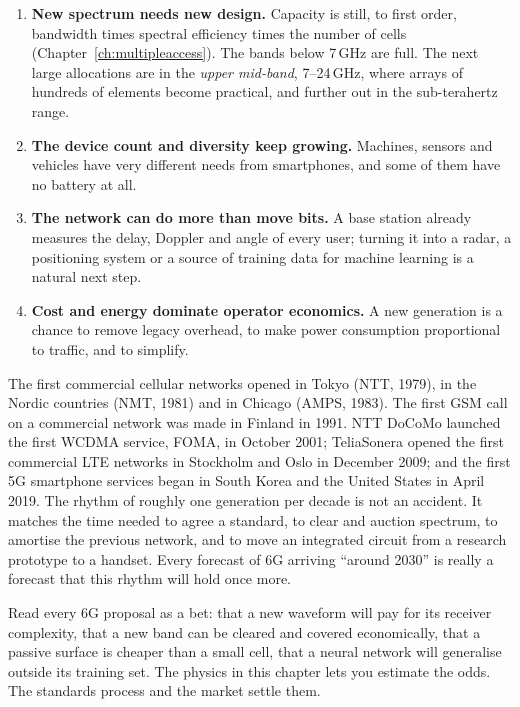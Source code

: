 
\begin{enumerate}
\item \textbf{New spectrum needs new design.} Capacity is still, to first order, bandwidth times
spectral efficiency times the number of cells (Chapter~\ref{ch:multipleaccess}). The bands below
7\,GHz are full. The next large allocations are in the \emph{upper mid-band}, 7--24\,GHz, where
arrays of hundreds of elements become practical, and further out in the sub-terahertz range.
\item \textbf{The device count and diversity keep growing.} Machines, sensors and vehicles have very
different needs from smartphones, and some of them have no battery at all.
\item \textbf{The network can do more than move bits.} A base station already measures the delay,
Doppler and angle of every user; turning it into a radar, a positioning system or a source of
training data for machine learning is a natural next step.
\item \textbf{Cost and energy dominate operator economics.} A new generation is a chance to remove
legacy overhead, to make power consumption proportional to traffic, and to simplify.
\end{enumerate}

\begin{history}
The first commercial cellular networks opened in Tokyo (NTT, 1979), in the Nordic countries (NMT,
1981) and in Chicago (AMPS, 1983). The first GSM call on a commercial network was made in Finland in
1991. NTT DoCoMo launched the first WCDMA service, FOMA, in October 2001; TeliaSonera opened the first
commercial LTE networks in Stockholm and Oslo in December 2009; and the first 5G smartphone services
began in South Korea and the United States in April 2019. The rhythm of roughly one generation per
decade is not an accident. It matches the time needed to agree a standard, to clear and auction
spectrum, to amortise the previous network, and to move an integrated circuit from a research
prototype to a handset. Every forecast of 6G arriving ``around 2030'' is really a forecast that this
rhythm will hold once more.
\end{history}

\begin{keyidea}
Read every 6G proposal as a bet: that a new waveform will pay for its receiver complexity, that a
new band can be cleared and covered economically, that a passive surface is cheaper than a small
cell, that a neural network will generalise outside its training set. The physics in this chapter
lets you estimate the odds. The standards process and the market settle them.
\end{keyidea}

